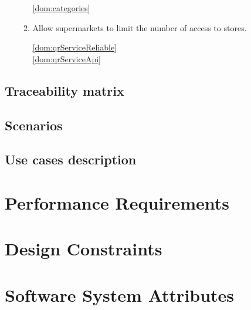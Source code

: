 \begin{enumerate}[label=\textbf{G.\arabic*}]
\begin{enumerate}[label*=\textbf{.\arabic*}]
            \ref{dom:categories}  ~\\


            \item Allow supermarkets to limit the number of access to stores.



            \ref{dom:qrServiceReliable}  ~\\
            \ref{dom:qrServiceApi}  ~\\
        \end{enumerate}
    \end{enumerate}

    \subsection{Traceability matrix}

    \subsection{Scenarios}

    \subsection{Use cases description}

\section{Performance Requirements}

\section{Design Constraints}

\section{Software System Attributes}
